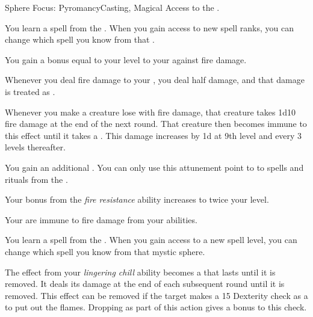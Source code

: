     \begin{feat}{Sphere Focus: Pyromancy}{Casting, Magical}
        \featpre Access to the  .

         You learn a spell from the  .
        When you gain access to new spell ranks, you can change which spell you know from that .

         You gain a bonus equal to your level to your  against fire damage.

         Whenever you deal fire damage to your , you deal half damage, and that damage is treated as .

         Whenever you make a creature lose  with fire damage, that creature takes 1d10 fire damage at the end of the next round.
        That creature then becomes immune to this effect until it takes a .
        This damage increases by \plus1d at 9th level and every 3 levels thereafter.

         You gain an additional .
        You can only use this attunement point to  to spells and rituals from the  .

         Your bonus from the \textit{fire resistance} ability increases to twice your level.

         Your  are immune to fire damage from your abilities.

         You learn a spell from the  .
        When you gain access to a new spell level, you can change which spell you know from that mystic sphere.

         The effect from your \textit{lingering chill} ability becomes a  that lasts until it is removed.
        It deals its damage at the end of each subsequent round until it is removed.
        This effect can be removed if the target makes a  15 Dexterity check as a  to put out the flames.
        Dropping \prone as part of this action gives a  bonus to this check.
    \end{feat}

